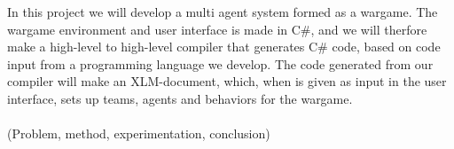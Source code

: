 In this project we will develop a multi agent system formed as a wargame. The wargame environment and user interface is made in C#, and we will therfore make a high-level to high-level compiler that generates C# code, based on code input from a programming language we develop. The code generated from our compiler will  make an XLM-document, which, when is given as input in the user interface, sets up teams, agents and behaviors for the wargame.\\
\\
(Problem, method, experimentation, conclusion)